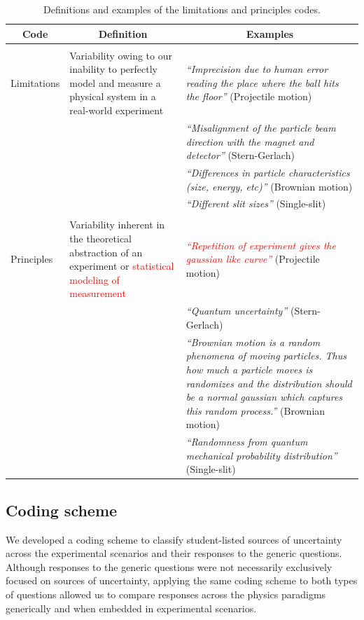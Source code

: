 \documentclass[english,aps,prstper,reprint,showpacs,longbibliography,superscriptaddress,nofootinbib]{revtex4-2}
\begin{document}
\begin{table}[tb] 
  \caption{Definitions and examples of the limitations and principles codes.}
  \label{ta:coding_scheme}
  \begin{ruledtabular}
    \begin{tabular}{p{}p{}p{}}
    \multicolumn{1}{c}{\textbf{Code}} & \multicolumn{1}{c}{\textbf{Definition}}& \multicolumn{1}{c}{\textbf{Examples}}\\
      \hline
      &&\\
    Limitations & Variability owing to our inability to perfectly model and measure a physical system in a real-world experiment & \textit{``Imprecision due to human error reading the place where the ball hits the floor''} (Projectile motion)\\
    && \textit{``Misalignment of the particle beam direction with the magnet and detector''} (Stern-Gerlach)\\
    &&\textit{``Differences in particle characteristics (size, energy, etc)''} (Brownian motion)\\
    &&\textit{``Different slit sizes''} (Single-slit)\\
    &&\\
    Principles & Variability inherent in the theoretical abstraction of an experiment or \textcolor{red}{statistical modeling of measurement} & \textcolor{red}{\textit{``Repetition of experiment gives the gaussian like curve''}} (Projectile motion) \\
    && \textit{``Quantum uncertainty''} (Stern-Gerlach) \\
    && \textit{ ``Brownian motion is a random phenomena of moving particles. Thus how much a particle moves is randomizes and the distribution should be a normal gaussian which captures this random process.''} (Brownian motion)\\
    & & \textit{ ``Randomness from quantum mechanical probability distribution''} (Single-slit)\\
    \end{tabular}
  \end{ruledtabular}
\end{table}

\subsection{Coding scheme}
\label{sec:coding_scheme}

We developed a coding scheme to classify student-listed sources of uncertainty across the experimental scenarios and their responses to the generic questions. Although responses to the generic questions were not necessarily exclusively focused on sources of uncertainty, applying the same coding scheme to both types of questions allowed us to compare responses across the physics paradigms generically and when embedded in experimental scenarios.
\end{document}
